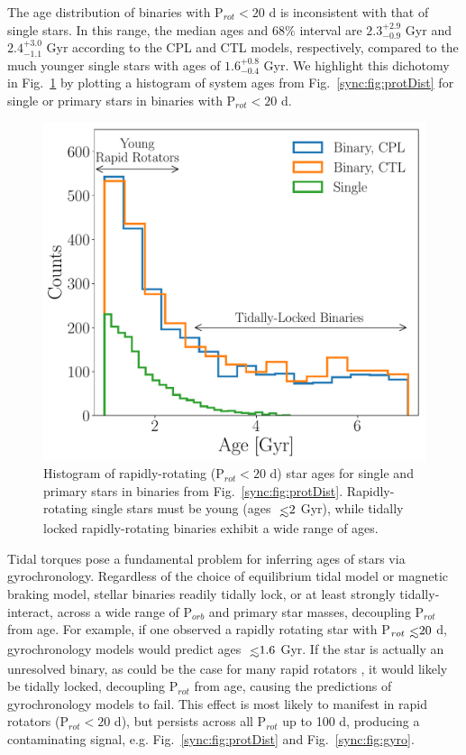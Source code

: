 The age distribution of binaries with P$_{rot} < 20$ d is inconsistent with that of single stars. In this range, the median ages and $68\%$ interval are $2.3^{+2.9}_{-0.9}$ Gyr and $2.4^{+3.0}_{-1.1}$ Gyr according to the CPL and CTL models, respectively, compared to the much younger single stars with ages of $1.6^{+0.8}_{-0.4}$ Gyr. We highlight this dichotomy in Fig.~\ref{sync:fig:protAgeHist} by plotting a histogram of system ages from Fig.~\ref{sync:fig:protDist} for single or primary stars in binaries with P$_{rot} < 20$ d. 

\begin{figure}
	\includegraphics[width=\columnwidth]{protAgeHist.pdf}
   \caption{Histogram of rapidly-rotating (P$_{rot} < 20$ d) star ages for single and primary stars in binaries from Fig.~\ref{sync:fig:protDist}. Rapidly-rotating single stars must be young (ages $\lsim 2$ Gyr), while tidally locked rapidly-rotating binaries exhibit a wide range of ages.}%
    \label{sync:fig:protAgeHist}%
\end{figure}

Tidal torques pose a fundamental problem for inferring ages of stars via gyrochronology. Regardless of the choice of equilibrium tidal model or magnetic braking model, stellar binaries readily tidally lock, or at least strongly tidally-interact, across a wide range of P$_{orb}$ and primary star masses, decoupling P$_{rot}$ from age. For example, if one observed a rapidly rotating star with P$_{rot} \lsim 20$ d, gyrochronology models would predict ages $\lsim 1.6$ Gyr. If the star is actually an unresolved binary, as could be the case for many \kepler rapid rotators \citep{Simonian2018}, it would likely be tidally locked, decoupling P$_{rot}$ from age, causing the predictions of gyrochronology models to fail. This effect is most likely to manifest in rapid rotators (P$_{rot} < 20$ d), but persists across all P$_{rot}$ up to 100 d, producing a contaminating signal, e.g. Fig.~\ref{sync:fig:protDist} and Fig.~\ref{sync:fig:gyro}.

